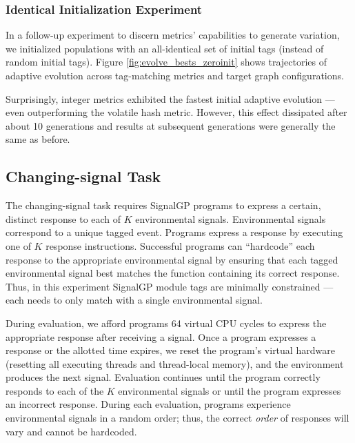 \subsubsection{Identical Initialization Experiment}



In a follow-up experiment to discern metrics' capabilities to generate variation, we initialized populations with an all-identical set of initial tags (instead of random initial tags).
Figure \ref{fig:evolve_bests_zeroinit} shows trajectories of adaptive evolution across tag-matching metrics and target graph configurations.

Surprisingly, integer metrics exhibited the fastest initial adaptive evolution --- even outperforming the volatile hash metric.
However, this effect dissipated after about 10 generations and results at subsequent generations were generally the same as before.

\subsection{Changing-signal Task} \label{sec:changing-signal}



The changing-signal task requires SignalGP programs to express a certain, distinct response to each of $K$ environmental signals.
Environmental signals correspond to a unique tagged event.
Programs express a response by executing one of $K$ response instructions.
Successful programs can ``hardcode'' each response to the appropriate environmental signal by ensuring that each tagged environmental signal best matches the function containing its correct response.
Thus, in this experiment SignalGP module tags are minimally constrained --- each needs to only match with a single environmental signal.

During evaluation, we afford programs 64 virtual CPU cycles to express the appropriate response after receiving a signal.
Once a program expresses a response or the allotted time expires, we reset the program's virtual hardware (resetting all executing threads and thread-local memory), and the environment produces the next signal.
Evaluation continues until the program correctly responds to each of the $K$ environmental signals or until the program expresses an incorrect response.
During each evaluation, programs experience environmental signals in a random order; thus, the correct \textit{order} of responses will vary and cannot be hardcoded.

